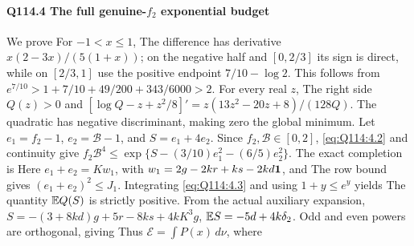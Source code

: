 \paragraph{Q114.4 The full genuine-$f_2$ exponential budget}\label{part:Q114.4}
We prove
For $-1<\allowbreak x\le\allowbreak 1$,
The difference has derivative $x(2-3x)/(5(1+x))$;
on the negative half and $[0,\allowbreak 2/3]$ its sign is direct,
while on $[2/3,\allowbreak 1]$ use the positive endpoint $7/10-\log2$.
This follows from $e^{7/10}>\allowbreak 1+7/10+49/200+343/6000>\allowbreak 2$.
For every real $z$,
The right side $Q(z)>\allowbreak 0$ and
$[\log Q-z+z^2/8]'=\allowbreak z(13z^2-20z+8)/(128Q)$.
The quadratic has negative discriminant, making zero the global minimum.
Let $e_1=\allowbreak f_2-1$, $e_2=\allowbreak \mathcal B-1$, and $S=\allowbreak e_1+4e_2$.
Since $f_2,\allowbreak \mathcal B\in[0,\allowbreak 2]$, \eqref{eq:Q114:4.2} and continuity give
$f_2\mathcal B^4\le\allowbreak \exp\{S-(3/10)e_1^2-(6/5)e_2^2\}$.
The exact completion is
Here $e_1+e_2=\allowbreak Kw_1$, with $w_1=\allowbreak 2g-2kr+ks-2kd\mathbf1$, and
The row bound gives $(e_1+e_2)^2\le\allowbreak  J_1$.
Integrating \eqref{eq:Q114:4.3} and using $1+y\le\allowbreak  e^y$ yields
The quantity $\mathbb E Q(S)$ is strictly positive.
From the actual auxiliary expansion,
$S=\allowbreak -(3+8kd)g+5r-8ks+4kK^3g$, $\mathbb E S=\allowbreak -5d+4k\delta_2$.
Odd and even powers are orthogonal, giving
Thus $\mathcal E=\allowbreak \int P(x)\,\allowbreak d\nu$, where
